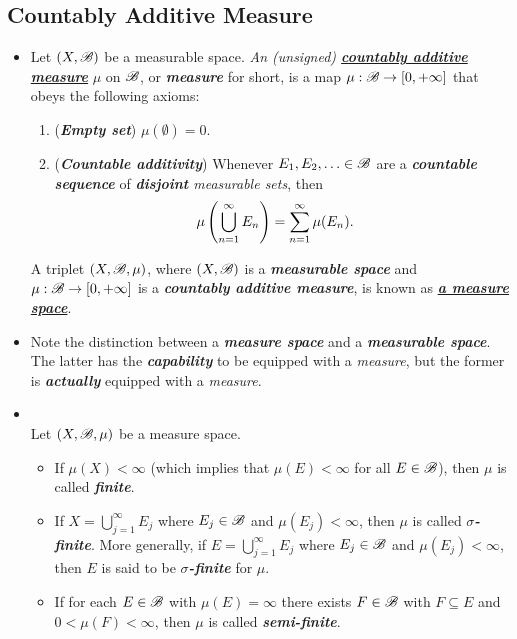 \documentclass[11pt]{article}
\begin{document}
\subsection{Countably Additive Measure}
\begin{itemize}
\item \begin{definition} 
Let $(X, {\mathscr B})$ be a measurable space. \emph{An (unsigned) \underline{\textbf{countably additive measure}}} $\mu$ on ${\mathscr B}$, or \emph{\textbf{measure}} for short, is a map $\mu: {\mathscr B} \rightarrow [0, +\infty]$ that obeys the following axioms:
\begin{enumerate}
\item (\emph{\textbf{Empty set}}) $\mu(\emptyset) = 0$.
\item (\emph{\textbf{Countable additivity}}) Whenever $E_1, E_2, \ldots \in {\mathscr B}$ are a \emph{\textbf{countable sequence}} of \emph{\textbf{disjoint} measurable sets}, then 
\begin{align*}
\mu\left(\bigcup_{n=1}^{\infty} E_n\right) &= \sum_{n=1}^{\infty} \mu(E_n).
\end{align*}
\end{enumerate}
A triplet $(X, {\mathscr B}, \mu)$, where $(X, {\mathscr B})$ is a \emph{\textbf{measurable space}} and $\mu: {\mathscr B} \rightarrow [0, +\infty]$ is a \emph{\textbf{countably additive measure}}, is known as \underline{\emph{\textbf{a measure space}}}.
\end{definition}

\item \begin{remark}
Note the distinction between a \emph{\textbf{measure space}} and a \emph{\textbf{measurable space}}. The latter has the \emph{\textbf{capability}} to be equipped with a \emph{measure}, but the former is \emph{\textbf{actually}} equipped with a \emph{measure}.
\end{remark}

\item \begin{definition} \citep{folland2013real}\\
Let $(X, {\mathscr B}, \mu)$ be a measure space. 
\begin{itemize}
\item If $\mu(X)< \infty$ (which implies that $\mu(E) < \infty$ for all $E \in {\mathscr B}$), then $\mu$ is called \emph{\textbf{finite}}. 
\item If $X = \bigcup_{j=1}^{\infty}E_j$ where $E_j \in {\mathscr B}$ and $\mu(E_j) < \infty$, then $\mu$ is called \emph{\textbf{$\sigma$-finite}}. More generally, if $E = \bigcup_{j=1}^{\infty}E_j$ where $E_j \in {\mathscr B}$ and $\mu(E_j) < \infty$, then $E$ is said to be \emph{\textbf{$\sigma$-finite}} for $\mu$.
\item If for each $E \in {\mathscr B}$ with $\mu(E) = \infty$ there exists $F\in {\mathscr B}$ with $F \subseteq E$ and $0 < \mu(F) < \infty$, then $\mu$ is called \emph{\textbf{semi-finite}}.
\end{itemize}
\end{definition}


\end{itemize}
\end{document}
